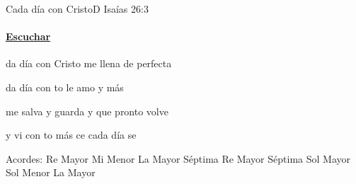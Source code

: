 \documentclass[12pt, spanish]{book}
\newcommand{\NotCCLIed}{\relax}
\begin{document}
    \begin{song}{Cada día con Cristo}{D}
        {} %
        {}
        {Isaías 26:3} %
        {} %
        \ifChordBk
        \paragraph{\mbox{}\hfill\protect\href{https://open.spotify.com/intl-es/track/0EtXTYDHwK81dnsloMPNha}{Escuchar}\mbox{}\hfill}
        \fi

        \begin{SBOpGroup}
            da día con Cristo me llena de perfecta 

            da día con to le amo  y más

             me salva y guarda y  que pronto volve

            y vi con to más ce cada día se
        \end{SBOpGroup}

        \ifChordBk
        \begin{SBOpGroup}
            Acordes:
            \upchord{\D}\qquad Re Mayor \hfill
            \upchord{\Em}\qquad Mi Menor \hfill\null\break
            \upchord{\Aseven}\qquad La Mayor S\'eptima \hfill
            \upchord{\Dseven}\qquad Re Mayor S\'eptima \hfill\null\break
            \upchord{\G}\qquad Sol Mayor \hfill
            \upchord{\Gm}\qquad Sol Menor \hfill\null\break
            \upchord{\A}\qquad La Mayor \hfill
        \end{SBOpGroup}
        \fi
    \end{song}
\end{document}
